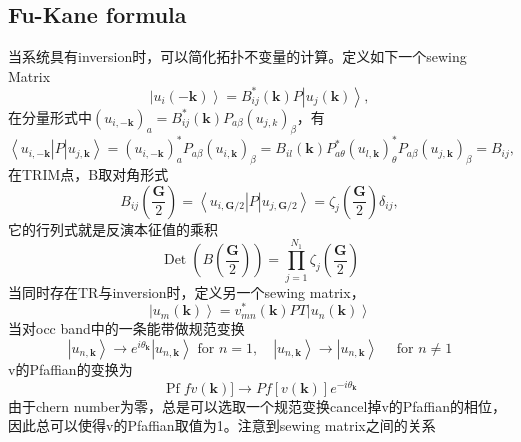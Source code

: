 \documentclass[10pt,openany]{book}
\theoremstyle{thmstyle} %
\theoremstyle{defstyle} %
\theoremstyle{prostyle} %
\begin{document}
\subsection{Fu-Kane formula}
当系统具有inversion时，可以简化拓扑不变量的计算。定义如下一个sewing Matrix
\begin{equation}
  \left|u_i(-\mathbf{k})\right\rangle=B_{i j}^*(\mathbf{k}) P\left|u_j(\mathbf{k})\right\rangle,
\end{equation}
在分量形式中$\left(u_{i,-\mathbf{k}}\right)_a=B_{i j}^*(\mathbf{k}) P_{a \beta}\left(u_{j, k}\right)_\beta$，有
\begin{equation}
  \left\langle u_{i,-\mathbf{k}}\right| P\left|u_{j, \mathbf{k}}\right\rangle=\left(u_{i,-\mathbf{k}}\right)_a^* P_{a \beta}\left(u_{i, \mathbf{k}}\right)_\beta=B_{i l}(\mathbf{k}) P_{a \theta}^*\left(u_{l, \mathbf{k}}\right)_\theta^* P_{a \beta}\left(u_{j, \mathbf{k}}\right)_\beta=B_{i j},
\end{equation}
在TRIM点，B取对角形式
\begin{equation*}
  B_{i j}\left(\frac{\mathbf{G}}{2}\right)=\left\langle u_{i, \mathbf{G} / 2}\right| P\left|u_{j, \mathbf{G} / 2}\right\rangle=\zeta_j\left(\frac{\mathbf{G}}{2}\right) \delta_{i j},
\end{equation*}
它的行列式就是反演本征值的乘积
\begin{equation*}
  \operatorname{Det}\left(B\left(\frac{\mathbf{G}}{2}\right)\right)=\prod_{j=1}^{N_1} \zeta_j\left(\frac{\mathbf{G}}{2}\right)
\end{equation*}
当同时存在TR与inversion时，定义另一个sewing matrix，
\begin{equation*}
  \left|u_m(\mathbf{k})\right\rangle=v_{m n}^*(\mathbf{k}) P T\left|u_n(\mathbf{k})\right\rangle
\end{equation*}
当对occ band中的一条能带做规范变换
\begin{equation*}
  \left|u_{n, \mathbf{k}}\right\rangle \rightarrow e^{i \theta_{\mathbf{k}}}\left|u_{n, \mathbf{k}}\right\rangle \text { for } n=1, \quad\left|u_{n, \mathbf{k}}\right\rangle \rightarrow\left|u_{n, \mathbf{k}}\right\rangle \quad \text { for } n \neq 1
\end{equation*}
v的Pfaffian的变换为
\begin{equation*}
  \operatorname{Pf} f v(\mathbf{k})] \rightarrow P f[v(\mathbf{k})] e^{-i \theta_{\mathbf{k}}}
\end{equation*}
由于chern number为零，总是可以选取一个规范变换cancel掉v的Pfaffian的相位，因此总可以使得v的Pfaffian取值为1。注意到sewing matrix之间的关系
\end{document}
